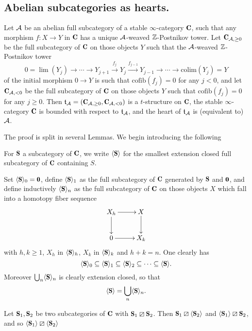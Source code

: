 \subsection{Abelian subcategories as hearts.}
\begin{proposition}\label{to.be.repeated.verbatim}
Let $\mathcal{A}$ be an abelian full subcategory of a stable $\infty$-category $\C$, such that any morphism $f\colon X\to Y$  in $\C$ has a unique $\mathcal{A}$-weaved $\mathbb{Z}$-Postnikov tower. Let
$\C_{\A,\geq 0}$ be the full subcategory of $\C$ on those objects $Y$ such that  the $\mathcal{A}$-weaved $\mathbb{Z}$-Postnikov tower
\[
0 =\lim(Y_j)\to\cdots \to Y_{j+1} \xrightarrow{f_{j}} Y_{j} \xrightarrow{f_{j-1}}Y_{j-1}\to \cdots\to \mathrm{colim}(Y_j)=Y
\]
of the initial morphism $0\to Y$ is such that $\mathrm{cofib}(f_j)=0$ for any $j< 0$, and let $\C_{\A,< 0}$ be the full subcategory of $\C$ on those objects $Y$ such that $\mathrm{cofib}(f_j)=0$ for any $j\geq 0$. Then $\mathfrak{t}_{\A}=(\C_{\A,\geq 0}, \C_{\A,<0})$ is a $t$-structure on $\C$, the stable $\infty$-category $\C$ is bounded with respect to $\mathfrak{t}_{\mathcal{A}}$, and the heart of $\mathfrak{t}_{\mathcal{A}}$ is (equivalent to) $\mathcal{A}$.
\end{proposition}
 The proof is split in several Lemmas. We begin introducing the following
\begin{notat}
For $\cate{S}$ a subcategory of $\C$, we write $\langle \cate{S}\rangle$ for the smallest extension closed full subcategory of $\C$ containing $S$.
\end{notat}
\begin{remark}\label{extensions}
Set  $\langle \cate{S}\rangle_0=\cate{0}$,  define $\langle \cate{S}\rangle_1$ as the full subcategory of $\C$ generated by $\cate{S}$ and $\cate{0}$, and define inductively $\langle \cate{S}\rangle_n$ as the full subcategory of $\C$ on those objects $X$ which fall into a homotopy fiber sequence
\[
\xymatrix{
X_h\ar[r]\ar[d]& X\ar[d]\\
0\ar[r] &X_k
}
\]
with $h,k\geq 1$, $X_h$ in $\langle \cate{S}\rangle_h$, $X_k$ in $\langle \cate{S}\rangle_k$ and $h+k=n$. One clearly has 
\[
\langle \cate{S}\rangle_0\subseteq \langle \cate{S}\rangle_1 \subseteq \langle \cate{S}\rangle_2\subseteq\cdots \subseteq \langle \cate{S}\rangle.
\]
Moreover $\bigcup_n \langle \cate{S}\rangle_n$ is clearly extension closed, so that
\[
\langle \cate{S}\rangle =\bigcup_n \langle \cate{S}\rangle_n.
\] 
\end{remark}
\begin{lemma}\label{closure}
Let $\cate{S}_1,\cate{S}_2$ be two subcategories of $\C$ with $\cate{S}_1\orth \cate{S}_2$. Then $\cate{S}_1\orth \langle\cate{S}_2\rangle$ and $\langle\cate{S}_1\rangle\orth \cate{S}_2$, and so $\langle\cate{S}_1\rangle\orth \langle\cate{S}_2\rangle$
\end{lemma}
